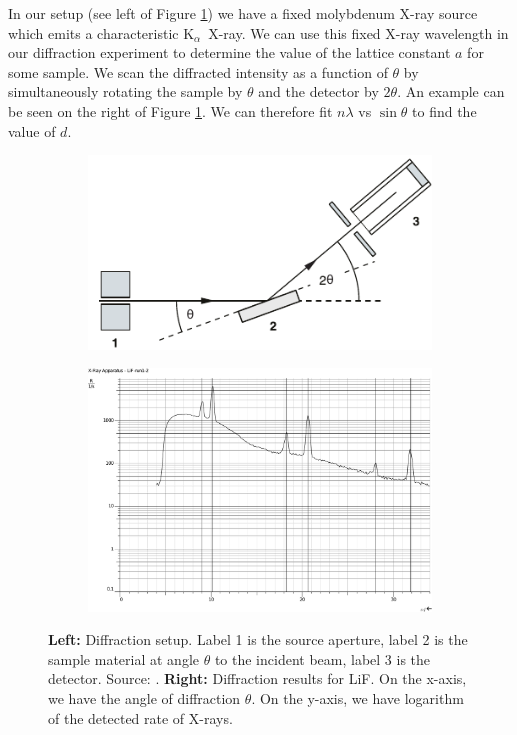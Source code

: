 \documentclass[11pt,a4paper,twoside,onecolumn]{article}
\newcommand{\Kalpha}{$\mathrm{K}_\alpha$~}
\begin{document}
In our setup (see left of Figure \ref{fig:diffraction-setup}) we have a fixed molybdenum X-ray source which emits a characteristic \Kalpha X-ray. We can use this fixed X-ray wavelength in our diffraction experiment to determine the value of the lattice constant $a$ for some sample. We scan the diffracted intensity as a function of $\theta$ by simultaneously rotating the sample by $\theta$ and the detector by $2\theta$. An example can be seen on the right of Figure \ref{fig:diffraction-setup}. We can therefore fit $n \lambda$ vs $\sin \theta$ to find the value of $d$.

\begin{figure}[!htbp]
    \hfill
    \begin{subfigure}[t]{0.4\textwidth}
        \centering
        \includegraphics[width=\textwidth]{img/diffraction-setup.pdf}
    \end{subfigure}
    \hfill
    \begin{subfigure}[t]{0.56\textwidth}
        \centering
        \includegraphics[width=\textwidth]{img/diffraction-LiF.pdf}
    \end{subfigure}
    \hfill
    \caption{\textbf{Left:} Diffraction setup. Label 1 is the source aperture, label 2 is the sample material at angle $\theta$ to the incident beam, label 3 is the detector. Source: \cite{OxfPhys2010}. \textbf{Right:} Diffraction results for LiF. On the x-axis, we have the angle of diffraction $\theta$. On the y-axis, we have logarithm of the detected rate of X-rays.}
    \label{fig:diffraction-setup}
\end{figure}
\end{document}
